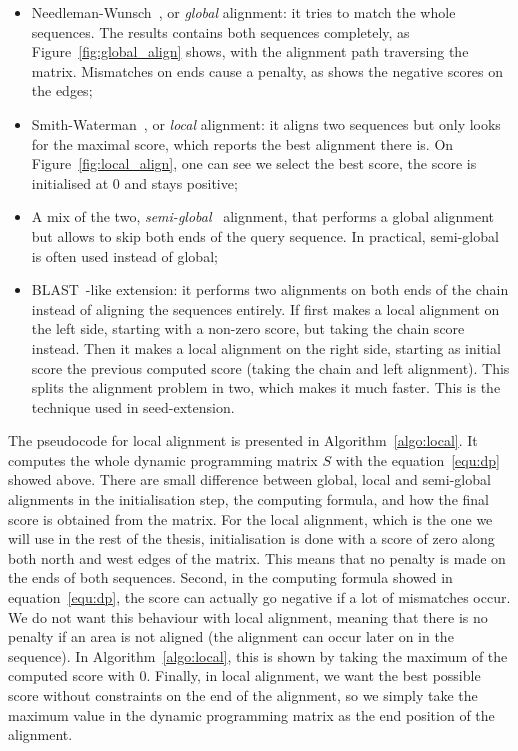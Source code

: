 \begin{itemize}
	\item Needleman-Wunsch~\cite{NeedlemanWunsch:method}, or \emph{global} alignment: it tries to match the whole sequences. The results contains both sequences completely, as Figure~\ref{fig:global_align} shows, with the alignment path traversing the matrix. Mismatches on ends cause a penalty, as shows the negative scores on the edges;
	\item Smith-Waterman~\cite{SmithWaterman:identification}, or \emph{local} alignment: it aligns two sequences but only looks for the maximal score, which reports the best alignment there is. On Figure~\ref{fig:local_align}, one can see we select the best score, the score is initialised at 0 and stays positive;
	\item A mix of the two, \emph{semi-global}~\cite{Durand:course-genomics} alignment, that performs a global alignment but allows to skip both ends of the query sequence. In practical, semi-global is often used instead of global;
	\item BLAST~\cite{Altschul:BLAST}-like extension: it performs two alignments on both ends of the chain instead of aligning the sequences entirely. If first makes a local alignment on the left side, starting with a non-zero score, but taking the chain score instead. Then it makes a local alignment on the right side, starting as initial score the previous computed score (taking the chain and left alignment). This splits the alignment problem in two, which makes it much faster. This is the technique used in seed-extension.
\end{itemize}

The pseudocode for local alignment is presented in Algorithm~\ref{algo:local}. It computes the whole dynamic programming matrix $S$ with the equation~\ref{equ:dp} showed above. There are small difference between global, local and semi-global alignments in the initialisation step, the computing formula, and how the final score is obtained from the matrix. For the local alignment, which is the one we will use in the rest of the thesis, initialisation is done with a score of zero along both north and west edges of the matrix. This means that no penalty is made on the ends of both sequences. Second, in the computing formula showed in equation~\ref{equ:dp}, the score can actually go negative if a lot of mismatches occur. We do not want this behaviour with local alignment, meaning that there is no penalty if an area is not aligned (the alignment can occur later on in the sequence). In Algorithm~\ref{algo:local}, this is shown by taking the maximum of the computed score with 0. Finally, in local alignment, we want the best possible score without constraints on the end of the alignment, so we simply take the maximum value in the dynamic programming matrix as the end position of the alignment.

